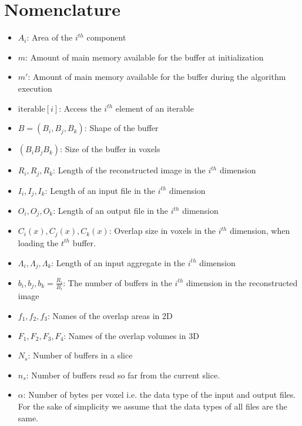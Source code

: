 \documentclass[conference]{IEEEtran}
\begin{document}
\section*{Nomenclature}
\begin{itemize}
  \item $A_i$: Area of the $i^{th}$ component
  \item $m$: Amount of main memory available for the buffer at initialization
  \item $m'$: Amount of main memory available for the buffer during the algorithm execution
  \item $\textrm{iterable}[i]$: Access the $i^{th}$ element of an iterable
  \item $B = (B_i, B_j, B_k)$: Shape of the buffer
  \item $(B_i B_j B_k)$: Size of the buffer in voxels
  \item $R_i, R_j, R_k$: Length of the reconstructed image in the $i^{th}$ dimension
  \item $I_i, I_j, I_k$: Length of an input file in the $i^{th}$ dimension
  \item $O_i, O_j, O_k$: Length of an output file in the $i^{th}$ dimension
  \item $C_i(x), C_j(x), C_k(x)$: Overlap size in voxels in the $i^{th}$ dimension, when loading the $t^{th}$ buffer.
  \item $\Lambda_i, \Lambda_j, \Lambda_k$: Length of an input aggregate in the $i^{th}$ dimension
  \item $b_i, b_j, b_k = \frac{R_i}{B_i}$: The number of buffers in the $i^{th}$ dimension in the reconstructed image
  \item $f_1, f_2, f_3$: Names of the overlap areas in 2D
  \item $F_1, F_2, F_3, F_4$: Names of the overlap volumes in 3D
  \item $ N_s $: Number of buffers in a slice
  \item $ n_s $: Number of buffers read so far from the current slice.
  \item $\alpha$: Number of bytes per voxel i.e. the data type of the input and output files. For the sake of simplicity we assume that the data types of all files are the same.
\end{itemize}

\end{document}
